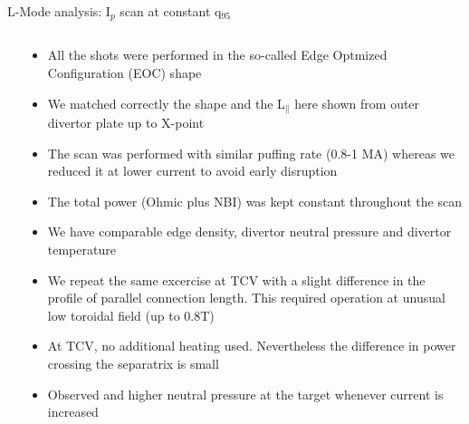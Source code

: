 \documentclass[10pt, compress]{beamer}
\newcommand\Fontvi{\fontsize{8}{7.2}\selectfont}
\begin{document}
\begin{frame}{L-Mode analysis: I$_p$ scan at constant q$_{95}$}
\Fontvi
  \vspace{-1cm}
  \begin{columns}    
  \begin{column}{0.65\textwidth}

  \end{column}
  \begin{column}{0.35\textwidth}
    \begin{itemize}
      \item<1|only@1> All the shots were performed in the so-called
        Edge Optmized Configuration (EOC) shape
      \item<1|only@1> We matched correctly the shape and the L$_{\parallel}$
        here shown from outer divertor plate up to X-point 
      \item<2|only@2> The scan was performed with similar puffing rate (0.8-1
        MA) whereas we reduced it at lower current to avoid early
        disruption
      \item<2|only@2> The total power (Ohmic plus NBI) was kept
        constant throughout the scan
      \item<2|only@2> We have comparable edge density, divertor neutral
        pressure and divertor temperature
      \item<3|only@3> We repeat the same excercise at TCV with a
        slight difference in the profile of parallel connection
        length. This required operation at unusual low toroidal field
        (up to 0.8T)
      \item<4|only@4> At TCV,  no additional heating
        used. Nevertheless the difference in power crossing the separatrix
        is small
      \item<4|only@4> Observed and higher neutral pressure at the
        target whenever current is increased  
      \end{itemize}
    \end{column}
\end{columns}
\end{frame}
\end{document}
